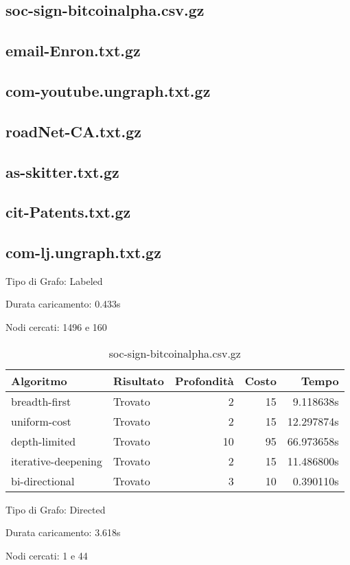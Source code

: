 \subsection{soc-sign-bitcoinalpha.csv.gz}
\subsection{email-Enron.txt.gz}
\subsection{com-youtube.ungraph.txt.gz}
\subsection{roadNet-CA.txt.gz}
\subsection{as-skitter.txt.gz}
\subsection{cit-Patents.txt.gz}
\subsection{com-lj.ungraph.txt.gz}
Tipo di Grafo: Labeled

Durata caricamento: 0.433s

Nodi cercati: 1496 e 160

\begin{table}[h]
\centering
\begin{tabular}{|l|l|r|r|r|}
\hline
\textbf{Algoritmo} & \textbf{Risultato} & \textbf{Profondità} & \textbf{Costo} & \textbf{Tempo} \\
 \hline
breadth-first & Trovato & 2 & 15 & 9.118638s \\
uniform-cost & Trovato & 2 & 15 & 12.297874s \\
depth-limited & Trovato & 10 & 95 & 66.973658s \\
iterative-deepening & Trovato & 2 & 15 & 11.486800s \\
bi-directional & Trovato & 3 & 10 & 0.390110s \\
\hline
\end{tabular}
\caption{soc-sign-bitcoinalpha.csv.gz}
\end{table}
Tipo di Grafo: Directed

Durata caricamento: 3.618s

Nodi cercati: 1 e 44

